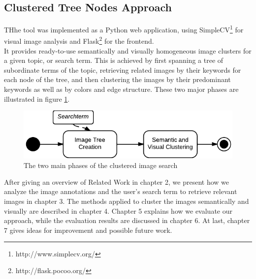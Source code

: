 \subsection{Clustered Tree Nodes Approach}
THhe tool was implemented as a Python web application, using SimpleCV\footnote{http://www.simplecv.org/} for visual image analysis and Flask\footnote{http://flask.pocoo.org/} for the frontend.\\
It provides ready-to-use semantically and visually homogeneous image clusters for a given topic, or search term. This is achieved by first spanning a tree of subordinate terms of the topic, retrieving related images by their keywords for each node of the tree, and then clustering the images by their predominant keywords as well as by colors and edge structure. These two major phases are illustrated in figure \ref{fig_overallprocess}.

\begin{figure}[h]
\centering
\includegraphics[]{images/search_process_highlevel.pdf}
\caption{The two main phases of the clustered image search}
\label{fig_overallprocess}
\end{figure}

After giving an overview of Related Work in chapter 2, we present how we analyze the image annotations and the user's search term to retrieve relevant images in chapter 3. The methods applied to cluster the images semantically and visually are described in chapter 4. Chapter 5 explains how we evaluate our approach, while the evaluation results are discussed in chapter 6. At last, chapter 7 gives ideas for improvement and possible future work.
